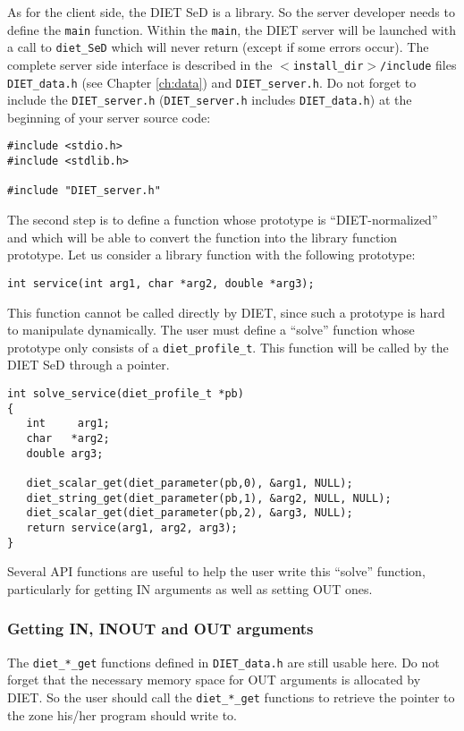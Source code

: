 As for the client side, the DIET SeD is a library. So the server developer needs
to define the \texttt{main} function. Within the \texttt{main}, the DIET server
will be launched with a call to \texttt{diet\_SeD} which will never return
(except if some errors occur). The complete server side interface is described
in the \texttt{$<$install\_dir$>$/include} files \texttt{DIET\_data.h} (see
Chapter \ref{ch:data}) and \texttt{DIET\_server.h}. Do not forget to include the \texttt{DIET\_server.h} (\texttt{DIET\_server.h} includes \texttt{DIET\_data.h}) at the beginning of your server source code:

{\footnotesize
\begin{verbatim}
#include <stdio.h>
#include <stdlib.h>

#include "DIET_server.h"
\end{verbatim}
}

The second step is to define a function whose prototype is ``DIET-normalized''
and which will be able to convert the function into the library function prototype.
Let us consider a library function with the following prototype:
{\footnotesize
\begin{verbatim}
int service(int arg1, char *arg2, double *arg3);
\end{verbatim}
}

This function cannot be called directly by DIET, since such a prototype is hard
to manipulate dynamically. The user must define a ``solve'' function whose
prototype only consists of a \texttt{diet\_profile\_t}.
This function will be called by the DIET SeD through a pointer.
{\footnotesize
\begin{verbatim}
int solve_service(diet_profile_t *pb)
{
   int     arg1;
   char   *arg2;
   double arg3;

   diet_scalar_get(diet_parameter(pb,0), &arg1, NULL);
   diet_string_get(diet_parameter(pb,1), &arg2, NULL, NULL);
   diet_scalar_get(diet_parameter(pb,2), &arg3, NULL);
   return service(arg1, arg2, arg3);
}
\end{verbatim}
}

Several API functions are useful to help the user write this ``solve''
function, particularly for getting IN arguments as well as setting OUT ones.

\subsubsection*{Getting IN, INOUT and OUT arguments}

The \texttt{diet\_*\_get} functions defined in \texttt{DIET\_data.h} are still
usable here. Do not forget that the necessary memory space for OUT arguments is
allocated by DIET. So the user should call the \texttt{diet\_*\_get} functions
to retrieve the pointer to the zone his/her program should write to.

